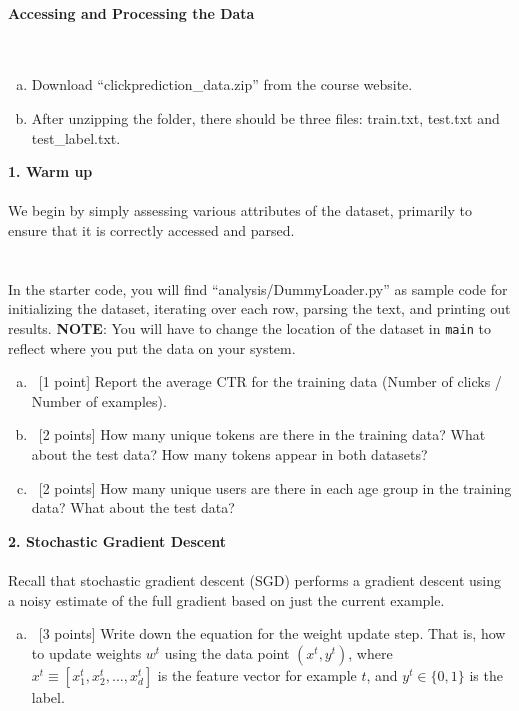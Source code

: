 \documentclass[12pt]{article}
\begin{document}
{\paragraph{Accessing and Processing the Data} ~
\begin{enumerate}[(a)]
  \item Download ``clickprediction\_data.zip'' from the course website. 
  \item After unzipping the folder, there should be three files: train.txt, test.txt and test\_label.txt. 
\end{enumerate}
{\bf 1. Warm up}
\\
\\We begin by simply assessing various attributes of the dataset, primarily to ensure that it is correctly accessed and parsed.
\\
\\%
\\ In the starter code, you will find ``analysis/DummyLoader.py'' as sample code for initializing the dataset, iterating over each row, parsing the text, and printing out results.  \textbf{NOTE}: You will have to change the location of the dataset in \texttt{main} to reflect where you put the data on your system.

\begin{enumerate}[(a)]
  \item ~[1 point] Report the average CTR for the training data (Number of clicks / Number of examples).
  \item ~[2 points] How many unique tokens are there in the training data? What about the test data? How many tokens appear in both datasets?
  \item ~[2 points] How many unique users are there in each age group in the training data? What about the test data?
\end{enumerate}
{\bf 2. Stochastic Gradient Descent}
\\
\\Recall that stochastic gradient descent (SGD) performs a gradient descent using a noisy estimate of the full gradient based on just the current example.

\begin{enumerate}[(a)]
  \item ~[3 points] Write down the equation for the weight update step. That is, how to update weights $w^t$ using the data point $(x^t, y^t)$, where $x^t \equiv [x_1^t, x_2^t, \dots, x_d^t]$ is the feature vector for example $t$, and $y^t \in \{0, 1\}$ is the label. 


\end{enumerate}}
\end{document}
